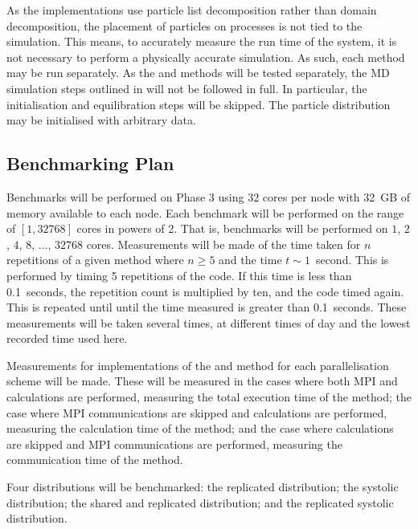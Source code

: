 %
As the implementations use particle list decomposition rather
than domain decomposition, the placement of particles on
processes is not tied to the simulation.
%
This means, to accurately measure the run time of the system,
it is not necessary to perform a physically accurate simulation.
%
As such, each method may be run separately.
%
As the \individualoperation{} and \pairoperation{} methods will
be tested separately, the MD simulation steps outlined in
will not be followed in full.
%
In particular, the initialisation and equilibration steps will
be skipped.
%
The particle distribution may be initialised with arbitrary data.


\subsection{Benchmarking Plan}

Benchmarks will be performed on \hector{} Phase 3 using
32 cores per node with 32~GB of memory available to each node.
%
Each benchmark will be performed on the range of $[1,32768]$ cores
in powers of 2.
%
That is, benchmarks will be performed on
$1$, $2$, $4$, $8$, $\dots{}$, $32768$ cores.
%
Measurements will be made of the time taken for $n$ repetitions of a given
method where $n \ge{} 5$ and the time $t \sim{} 1$~second.
%
This is performed by timing 5 repetitions of the code.
%
If this time is less than 0.1~seconds, the repetition count is
multiplied by ten, and the code timed again.
%
This is repeated until until the time measured is greater than 0.1~seconds.
%
These measurements will be taken several times, at different times of
day and the lowest recorded time used here.

Measurements for implementations of
the \individualoperation{} and \pairoperation{} method
for each parallelisation scheme will be made.
%
These will be measured in the cases where both MPI and calculations
are performed, measuring the total execution time of the method;
the case where MPI communications are skipped and calculations are
performed, measuring the calculation time of the method; and
the case where calculations are skipped and MPI communications are
performed, measuring the communication time of the method.

Four distributions will be benchmarked:
%
the replicated distribution; the systolic distribution;
the shared and replicated distribution; and
the replicated systolic distribution.

